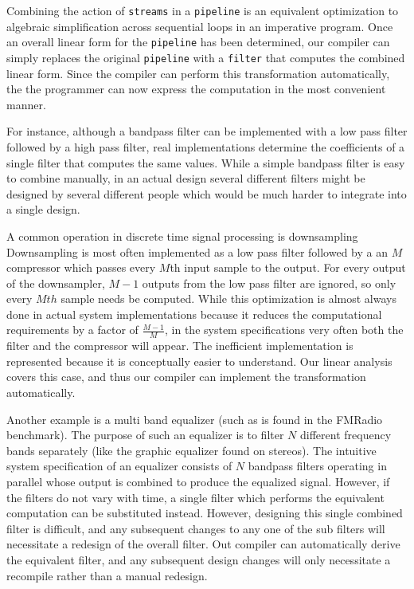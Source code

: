 Combining the action of {\tt streams} in a {\tt pipeline} is an equivalent optimization 
to algebraic simplification across sequential loops in an imperative program.
Once an overall linear form for the {\tt pipeline} has been determined, our compiler 
can simply replaces the original {\tt pipeline} with a {\tt filter} that computes the 
combined linear form. Since the compiler can perform this transformation automatically,
the the programmer can now express the computation in the most convenient manner. 

For instance, although a bandpass filter can be implemented with a 
low pass filter followed by a high pass filter, real implementations determine the coefficients 
of a single filter that computes the same values. While a simple bandpass filter is easy to combine
manually, in an actual design several different filters might be designed by 
several different people which would be much harder to integrate into a single design.

A common operation in discrete time signal processing is downsampling
Downsampling is most often implemented as a low pass filter followed by a 
an $M$ compressor which passes every $M$th input sample to the output.
For every output of the downsampler, $M-1$ outputs from the low pass filter
are ignored, so only every $Mth$ sample needs be computed.
While this optimization is almost always done in actual system implementations because it reduces 
the computational requirements by a factor of $\frac{M-1}{M}$, in the system specifications
very often both the filter and the compressor will appear. The inefficient
implementation is represented because it is conceptually easier to understand. 
Our linear analysis covers this case, and thus our compiler can implement the transformation
automatically.

Another example is a multi band equalizer (such as is found in the FMRadio benchmark). 
The purpose of such an equalizer is to filter $N$ different frequency bands 
separately (like the graphic equalizer found on stereos). The intuitive system specification 
of an equalizer consists of $N$ bandpass filters operating in parallel whose output 
is combined to produce the equalized signal. However, if the filters do not vary with time, 
a single filter which performs the equivalent computation can be substituted instead. 
However, designing this single combined filter is difficult, and any subsequent changes to 
any one of the sub filters will necessitate a redesign of the overall filter. 
Out compiler can automatically derive the equivalent filter, and any subsequent design changes
will only necessitate a recompile rather than a manual redesign.


